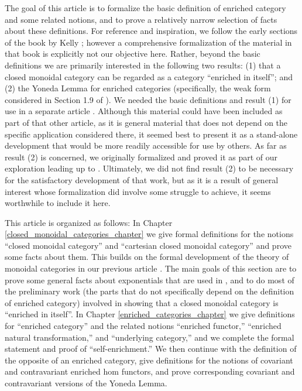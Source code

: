\documentclass[11pt,notitlepage,a4paper]{report}
\begin{document}
The goal of this article is to formalize the basic definition of enriched category and
some related notions, and to prove a relatively narrow selection of facts about these definitions.
For reference and inspiration, we follow the early sections of the book by
Kelly \cite{kelly-enriched-category}; however a comprehensive formalization of the material
in that book is explicitly not our objective here.
Rather, beyond the basic definitions we are primarily interested in the following two results:
(1) that a closed monoidal category can be regarded as a category ``enriched in itself''; and
(2) the Yoneda Lemma for enriched categories
(specifically, the weak form considered in Section 1.9 of \cite{kelly-enriched-category}).
We needed the basic definitions and result (1) for use in a separate article
\cite{ResiduatedTransitionSystem2-AFP}.
Although this material could have been included as part of that other article,
as it is general material that does not depend on the specific application considered there,
it seemed best to present it as a stand-alone development that would be more readily
accessible for use by others.
As far as result (2) is concerned, we originally formalized and proved it as part of our exploration
leading up to \cite{ResiduatedTransitionSystem2-AFP}.
Ultimately, we did not find result (2) to be necessary for the satisfactory development
of that work, but as it is a result of general interest whose formalization did involve
some struggle to achieve, it seems worthwhile to include it here.

This article is organized as follows:
In Chapter \ref{closed_monoidal_categories_chapter} we give formal definitions for the
notions ``closed monoidal category'' and ``cartesian closed monoidal category'' and
prove some facts about them.  This builds on the formal development of the theory of
monoidal categories in our previous article \cite{MonoidalCategory-AFP}.
The main goals of this section are to prove some general facts about exponentials that are
used in \cite{ResiduatedTransitionSystem2-AFP}, and to do most of the preliminary work
(the parts that do not specifically depend on the definition of enriched category)
involved in showing that a closed monoidal category is ``enriched in itself''.
In Chapter \ref{enriched_categories_chapter} we give definitions for ``enriched category''
and the related notions ``enriched functor,'' ``enriched natural transformation,''
and ``underlying category,'' and we complete the formal statement and proof of
``self-enrichment.''
We then continue with the definition of the opposite of an enriched category,
give definitions for the notions of covariant and contravariant enriched hom functors,
and prove corresponding covariant and contravariant versions of the Yoneda Lemma.
\end{document}

